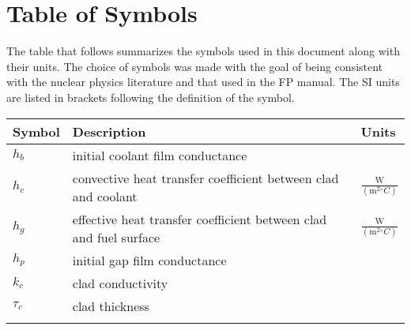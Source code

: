 \documentclass[12pt]{article}
\begin{document}
\section{Table of Symbols}
\label{Sec:ToS}
The table that follows summarizes the symbols used in this document along with their units.  The choice of symbols was made with the goal of being consistent with the nuclear physics literature and that used in the FP manual.  The SI units are listed in brackets following the definition of the symbol.
\begin{longtable*}{l l l}
\toprule
Symbol & Description & Units
\\
\midrule
$h_{b}$ & initial coolant film conductance & 
\\
$h_{c}$ & convective heat transfer coefficient between clad and coolant & $\frac{\text{W}}{(\text{m}^{2}{}^{\circ}C)}$
\\
$h_{g}$ & effective heat transfer coefficient between clad and fuel surface & $\frac{\text{W}}{(\text{m}^{2}{}^{\circ}C)}$
\\
$h_{p}$ & initial gap film conductance & 
\\
$k_{c}$ & clad conductivity & 
\\
$\tau{}_{c}$ & clad thickness & 
\\
\bottomrule
\label{Table:ToS}
\end{longtable*}
\end{document}
